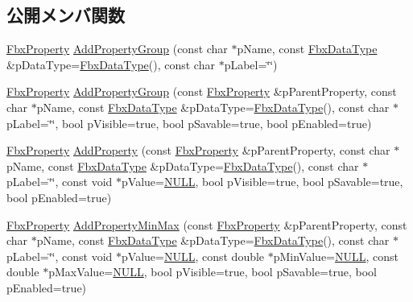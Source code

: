 \subsection*{公開メンバ関数}
\begin{DoxyCompactItemize}
\item 
\hyperlink{class_fbx_property}{Fbx\+Property} \hyperlink{class_fbx_i_o_settings_abf6db228c12b2b36500eba034685b3cb}{Add\+Property\+Group} (const char $\ast$p\+Name, const \hyperlink{class_fbx_data_type}{Fbx\+Data\+Type} \&p\+Data\+Type=\hyperlink{class_fbx_data_type}{Fbx\+Data\+Type}(), const char $\ast$p\+Label=\char`\"{}\char`\"{})
\item 
\hyperlink{class_fbx_property}{Fbx\+Property} \hyperlink{class_fbx_i_o_settings_a108fa53c9bd3d89963f098a18f97e349}{Add\+Property\+Group} (const \hyperlink{class_fbx_property}{Fbx\+Property} \&p\+Parent\+Property, const char $\ast$p\+Name, const \hyperlink{class_fbx_data_type}{Fbx\+Data\+Type} \&p\+Data\+Type=\hyperlink{class_fbx_data_type}{Fbx\+Data\+Type}(), const char $\ast$p\+Label=\char`\"{}\char`\"{}, bool p\+Visible=true, bool p\+Savable=true, bool p\+Enabled=true)
\item 
\hyperlink{class_fbx_property}{Fbx\+Property} \hyperlink{class_fbx_i_o_settings_adcfa47da119520473f466bfff28cdbe2}{Add\+Property} (const \hyperlink{class_fbx_property}{Fbx\+Property} \&p\+Parent\+Property, const char $\ast$p\+Name, const \hyperlink{class_fbx_data_type}{Fbx\+Data\+Type} \&p\+Data\+Type=\hyperlink{class_fbx_data_type}{Fbx\+Data\+Type}(), const char $\ast$p\+Label=\char`\"{}\char`\"{}, const void $\ast$p\+Value=\hyperlink{fbxarch_8h_a070d2ce7b6bb7e5c05602aa8c308d0c4}{N\+U\+LL}, bool p\+Visible=true, bool p\+Savable=true, bool p\+Enabled=true)
\item 
\hyperlink{class_fbx_property}{Fbx\+Property} \hyperlink{class_fbx_i_o_settings_a74e2aa168f3b0cac2a80ac355c5c4611}{Add\+Property\+Min\+Max} (const \hyperlink{class_fbx_property}{Fbx\+Property} \&p\+Parent\+Property, const char $\ast$p\+Name, const \hyperlink{class_fbx_data_type}{Fbx\+Data\+Type} \&p\+Data\+Type=\hyperlink{class_fbx_data_type}{Fbx\+Data\+Type}(), const char $\ast$p\+Label=\char`\"{}\char`\"{}, const void $\ast$p\+Value=\hyperlink{fbxarch_8h_a070d2ce7b6bb7e5c05602aa8c308d0c4}{N\+U\+LL}, const double $\ast$p\+Min\+Value=\hyperlink{fbxarch_8h_a070d2ce7b6bb7e5c05602aa8c308d0c4}{N\+U\+LL}, const double $\ast$p\+Max\+Value=\hyperlink{fbxarch_8h_a070d2ce7b6bb7e5c05602aa8c308d0c4}{N\+U\+LL}, bool p\+Visible=true, bool p\+Savable=true, bool p\+Enabled=true)
\item 

\end{DoxyCompactItemize}
